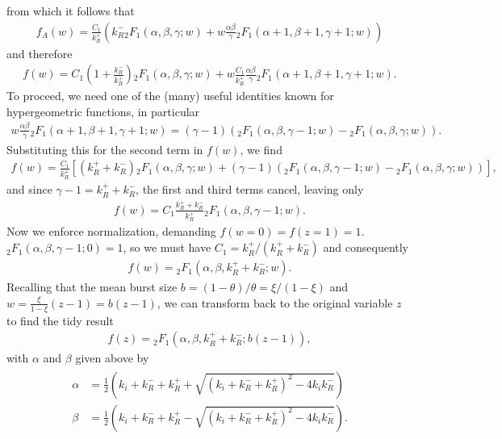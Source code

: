from which it follows that
\begin{align}
f_A(w) = \frac{C_1}{k_R^+}
\left(
k_R^- {_2F_1}(\alpha, \beta, \gamma; w)
+ w\frac{\alpha\beta}{\gamma} {_2F_1}(\alpha+1, \beta+1, \gamma+1; w)
\right)
\end{align}
and therefore
\begin{align}
f(w) = C_1\left(1 + \frac{k_R^-}{k_R^+}\right)
        {_2F_1}(\alpha, \beta, \gamma; w)
+ w \frac{C_1}{k_R^+} \frac{\alpha\beta}{\gamma}
        {_2F_1}(\alpha+1, \beta+1, \gamma+1; w).
\end{align}
To proceed, we need one of the (many) useful identities known for
hypergeometric functions, in particular
\begin{align}
w\frac{\alpha\beta}{\gamma} {_2F_1}(\alpha+1, \beta+1, \gamma+1; w)
=
(\gamma-1)\left(
{_2F_1}(\alpha, \beta, \gamma-1; w) - {_2F_1}(\alpha, \beta, \gamma; w)
\right).
\end{align}
Substituting this for the second term in $f(w)$, we find
\begin{align}
f(w) = \frac{C_1}{k_R^+}
\left[
        \left(k_R^+ + k_R^-\right)
        {_2F_1}(\alpha, \beta, \gamma; w)
+ (\gamma-1)\left(
        {_2F_1}(\alpha, \beta, \gamma-1; w) - {_2F_1}(\alpha, \beta, \gamma; w)
        \right)
\right],
\end{align}
and since $\gamma-1 = k_R^+ + k_R^-$, the first and third terms cancel,
leaving only
\begin{align}
f(w) = C_1\frac{k_R^+ + k_R^-}{k_R^+} {_2F_1}(\alpha, \beta, \gamma-1; w).
\end{align}
Now we enforce normalization, demanding $f(w=0) = f(z=1) = 1$.
${_2F_1}(\alpha, \beta, \gamma-1; 0) = 1$, so we must have
$C_1 = k_R^+ / (k_R^+ + k_R^-)$ and consequently
\begin{align}
f(w) =  {_2F_1}(\alpha, \beta, k_R^+ + k_R^-; w).
\end{align}
Recalling that the mean burst size $b = (1-\theta)/\theta = \xi/(1-\xi)$
and $w = \frac{\xi}{1-\xi} (z-1) = b (z-1)$,
we can transform back to the original variable $z$ to find the tidy result
\begin{align}
f(z) =  {_2F_1}(\alpha, \beta, k_R^+ + k_R^-; b(z-1)),
\end{align}
with $\alpha$ and $\beta$ given above by
\begin{align}
\begin{split}
\alpha &= \frac{1}{2}
\left(k_i+k_R^-+k_R^+ + \sqrt{(k_i+k_R^-+k_R^+)^2 - 4k_i k_R^-}\right)
\\
\beta &= \frac{1}{2}
\left(k_i+k_R^-+k_R^+ - \sqrt{(k_i+k_R^-+k_R^+)^2 - 4k_i k_R^-}\right).
\end{split}
\end{align}
